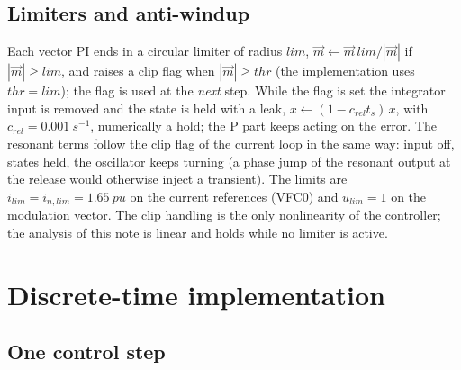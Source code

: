 \documentclass[10pt,a4paper]{scrartcl}
\newcommand{\ts}{t_s}
\begin{document}
\begin{onehalfspace}
\subsection{Limiters and anti-windup}
\label{sec:limits}

Each vector PI ends in a circular limiter of radius $lim$, $\vec m \leftarrow \vec m\,lim/|\vec m|$ if $|\vec m| \ge lim$, and raises a clip flag when $|\vec m| \ge thr$ (the implementation uses $thr = lim$); the flag is used at the \emph{next} step. While the flag is set the integrator input is removed and the state is held with a leak, $x \leftarrow (1 - c_{rel}\ts)\,x$, with $c_{rel} = \SI{0.001}{s^{-1}}$, numerically a hold; the P part keeps acting on the error. The resonant terms follow the clip flag of the current loop in the same way: input off, states held, the oscillator keeps turning (a phase jump of the resonant output at the release would otherwise inject a transient). The limits are $i_{lim} = i_{n,lim} = \SI{1.65}{pu}$ on the current references (VFC0) and $u_{lim} = 1$ on the modulation vector. The clip handling is the only nonlinearity of the controller; the analysis of this note is linear and holds while no limiter is active.

\section{Discrete-time implementation}
\label{sec:discrete}

\subsection{One control step}
\label{sec:step}


\end{onehalfspace}
\end{document}
